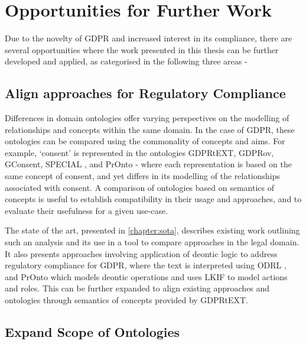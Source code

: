 \section{Opportunities for Further Work}\label{sec:conclusion-future-work}
Due to the novelty of GDPR and increased interest in its compliance, there are several opportunities where the work presented in this thesis can be further developed and applied, as categorised in the following three areas -
\subsection*{Align approaches for Regulatory Compliance}
Differences in domain ontologies offer varying perspectives on the modelling of relationships and concepts within the same domain. In the case of GDPR, these ontologies can be compared using the commonality of concepts and aims. For example, `consent' is represented in the ontologies GDPRtEXT, GDPRov, GConsent, SPECIAL \cite{kirrane_scalable_2018}, and PrOnto \cite{palmirani_pronto_2018} - where each representation is based on the same concept of consent, and yet differs in its modelling of the relationships associated with consent. A comparison of ontologies based on semantics of concepts is useful to establish compatibility in their usage and approaches, and to evaluate their usefulness for a given use-case.

The state of the art, presented in \autoref{chapter:sota}, describes existing work outlining such an analysis \cite{leone_taking_2019} and its use in a tool \cite{leone_legal_2018} to compare approaches in the legal domain. It also presents approaches involving application of deontic logic to address regulatory compliance for GDPR, where the text is interpreted using ODRL \cite{agarwal_legislative_2018}, and  PrOnto \cite{palmirani_pronto_2018} which models deontic operations and uses LKIF \cite{hoekstra_lkif_2007} to model actions and roles.
This can be further expanded to align existing approaches and ontologies through semantics of concepts provided by GDPRtEXT.

\subsection*{Expand Scope of Ontologies}
